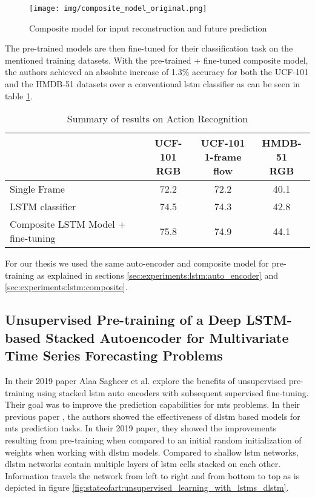 \begin{figure}[h]
	\centering
	\texttt{[image: img/composite\_model\_original.png]}
	\caption{Composite model for input reconstruction and future prediction \cite{unsupervised_learning_lstms}}
	\label{fig:stateofart:unsupervised_lstm_composite}
\end{figure}

The pre-trained models are then fine-tuned for their classification task on the mentioned training datasets. With the pre-trained + fine-tuned composite model, the authors achieved an absolute increase of 1.3\% accuracy for both the UCF-101 and the HMDB-51 datasets over a conventional \gls{lstm} classifier as can be seen in table \ref{table:stateofart:unsupervised_learning_results}.

\begin{table}[]
	\centering
	\begin{tabular}{l c c c}
		\thead{Model} & \thead{UCF-101 \\ RGB} & \thead{UCF-101
\\ 1-frame flow} & \thead{HMDB-51 \\
RGB} \\ \hline
		\midrule
		Single Frame & 72.2 & 72.2 & 40.1 \\
		\midrule
		LSTM classifier & 74.5 & 74.3 & 42.8 \\
		\midrule
		Composite LSTM
Model + fine-tuning & 75.8 & 74.9 & 44.1 \\
	\end{tabular}
	\caption{Summary of results on Action Recognition \cite{unsupervised_learning_lstms}}
	\label{table:stateofart:unsupervised_learning_results}
\end{table}

For our thesis we used the same auto-encoder and composite model for pre-training as explained in sections \ref{sec:experiments:lstm:auto_encoder} and \ref{sec:experiments:lstm:composite}.

\subsection{Unsupervised Pre-training of a Deep LSTM-based Stacked Autoencoder for Multivariate Time Series Forecasting Problems} \label{sec:stateofart:unsupervised_learning_lstms_timeseries}

In their 2019 paper \cite{unsupervised_learning_lstms_timeseries} Alaa Sagheer et al. explore the benefits of unsupervised pre-training using stacked \gls{lstm} auto encoders with subsequent supervised fine-tuning. Their goal was to improve the prediction capabilities for \gls{mts} problems. In their previous paper \cite{dlstm_time_series_forecasting}, the authors showed the effectiveness of \gls{dlstm} based models for \gls{mts} prediction tasks. In their 2019 paper, they showed the improvements resulting from pre-training when compared to an initial random initialization of weights when working with \gls{dlstm} models. Compared to shallow \gls{lstm} networks, \gls{dlstm} networks contain multiple layers of \gls{lstm} cells stacked on each other. Information travels the network from left to right and from bottom to top as is depicted in figure \ref{fig:stateofart:unsupervised_learning_with_lstms_dlstm}. 

